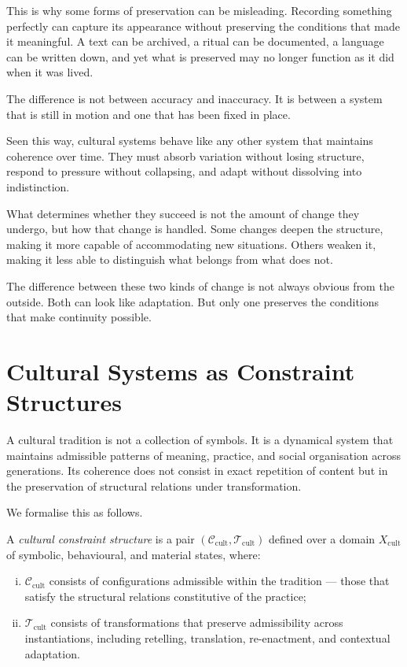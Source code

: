 \documentclass[11pt,openany]{book}
\begin{document}
This is why some forms of preservation can be misleading.
Recording something perfectly can capture its appearance
without preserving the conditions that made it meaningful.
A text can be archived, a ritual can be documented, a
language can be written down, and yet what is preserved may
no longer function as it did when it was lived.

The difference is not between accuracy and inaccuracy.  It
is between a system that is still in motion and one that has
been fixed in place.

Seen this way, cultural systems behave like any other system
that maintains coherence over time.  They must absorb
variation without losing structure, respond to pressure
without collapsing, and adapt without dissolving into
indistinction.

What determines whether they succeed is not the amount of
change they undergo, but how that change is handled.  Some
changes deepen the structure, making it more capable of
accommodating new situations.  Others weaken it, making it
less able to distinguish what belongs from what does not.

The difference between these two kinds of change is not
always obvious from the outside.  Both can look like
adaptation.  But only one preserves the conditions that make
continuity possible.

\section{Cultural Systems as Constraint Structures}
\label{sec:culture-constraints}

A cultural tradition is not a collection of symbols.  It is
a dynamical system that maintains admissible patterns of
meaning, practice, and social organisation across
generations.  Its coherence does not consist in exact
repetition of content but in the preservation of structural
relations under transformation.

We formalise this as follows.

\begin{definition}
\label{def:cultural-constraint}
A \emph{cultural constraint structure} is a pair
$(\mathcal{C}_{\mathrm{cult}}, \mathcal{T}_{\mathrm{cult}})$
defined over a domain $X_{\mathrm{cult}}$ of symbolic,
behavioural, and material states, where:
\begin{enumerate}[(i)]
  \item $\mathcal{C}_{\mathrm{cult}}$ consists of
    configurations admissible within the tradition —
    those that satisfy the structural relations
    constitutive of the practice;
  \item $\mathcal{T}_{\mathrm{cult}}$ consists of
    transformations that preserve admissibility across
    instantiations, including retelling, translation,
    re-enactment, and contextual adaptation.
\end{enumerate}
\end{definition}
\end{document}
